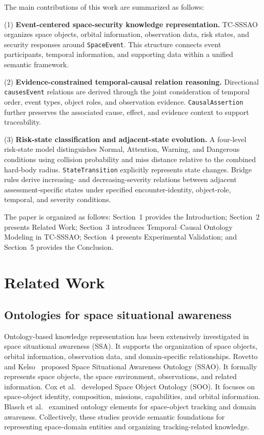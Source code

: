 \documentclass[Royal,sageh,times]{sagej}
\newcommand{\ont}[1]{{\urlstyle{tt}\nolinkurl{#1}}}
\begin{document}
The main contributions of this work are summarized as follows:

(1) \textbf{Event-centered space-security knowledge representation.} TC-SSSAO organizes space objects, orbital information, observation data, risk states, and security responses around \ont{SpaceEvent}. This structure connects event participants, temporal information, and supporting data within a unified semantic framework.

(2) \textbf{Evidence-constrained temporal-causal relation reasoning.} Directional \ont{causesEvent} relations are derived through the joint consideration of temporal order, event types, object roles, and observation evidence. \ont{CausalAssertion} further preserves the associated cause, effect, and evidence context to support traceability.

(3) \textbf{Risk-state classification and adjacent-state evolution.} A four-level risk-state model distinguishes Normal, Attention, Warning, and Dangerous conditions using collision probability and miss distance relative to the combined hard-body radius. \ont{StateTransition} explicitly represents state changes. Bridge rules derive increasing- and decreasing-severity relations between adjacent assessment-specific states under specified encounter-identity, object-role, temporal, and severity conditions.

The paper is organized as follows: Section~1 provides the Introduction; Section~2 presents Related Work; Section~3 introduces Temporal--Causal Ontology Modeling in TC-SSSAO; Section~4 presents Experimental Validation; and Section~5 provides the Conclusion.
\section{Related Work}

\subsection{Ontologies for space situational awareness}

Ontology-based knowledge representation has been extensively investigated in space situational awareness (SSA). It supports the organization of space objects, orbital information, observation data, and domain-specific relationships. Rovetto and Kelso~\citep{rovetto2016ssao} proposed Space Situational Awareness Ontology (SSAO). It formally represents space objects, the space environment, observations, and related information. Cox et al.~\citep{cox2016soo} developed Space Object Ontology (SOO). It focuses on space-object identity, composition, missions, capabilities, and orbital information. Blasch et al.~\citep{blasch2022spacetrack} examined ontology elements for space-object tracking and domain awareness. Collectively, these studies provide semantic foundations for representing space-domain entities and organizing tracking-related knowledge.
\end{document}

